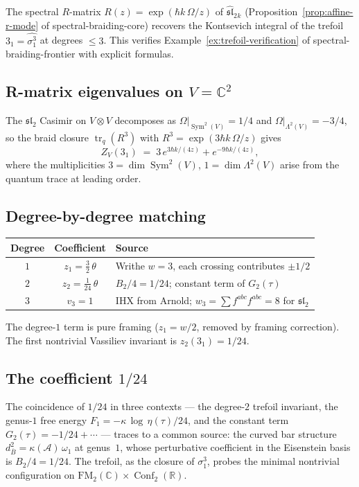 \documentclass[11pt]{article}
\newcommand{\cA}{\mathcal{A}}
\newcommand{\fsl}{\mathfrak{sl}}
\newcommand{\barB}{\overline{B}}
\newcommand{\C}{\mathbb{C}}
\newcommand{\R}{\mathbb{R}}
\newcommand{\FM}{\mathrm{FM}}
\DeclareMathOperator{\Conf}{Conf}
\DeclareMathOperator{\Sym}{Sym}
\begin{document}
The spectral $R$-matrix $R(z) = \exp(\hbar k\,\Omega/z)$ of
$\widehat{\fsl}_2{}_k$
(Proposition~\ref{prop:affine-r-mode} of spectral-braiding-core)
recovers the Kontsevich integral of the trefoil $3_1 =
\widehat{\sigma_1^3}$ at degrees $\le 3$.  This verifies
Example~\ref{ex:trefoil-verification} of spectral-braiding-frontier
with explicit formulas.

\subsection*{R-matrix eigenvalues on $V = \C^2$}

The $\fsl_2$ Casimir on $V \otimes V$ decomposes as
$\Omega|_{\Sym^2(V)} = 1/4$ and
$\Omega|_{\Lambda^2(V)} = -3/4$, so the braid closure
$\operatorname{tr}_q(R^3)$ with $R^3 = \exp(3\hbar k\,\Omega/z)$
gives
\[
  Z_V(3_1)
  \;=\;
  3\,e^{3\hbar k/(4z)} + e^{-9\hbar k/(4z)},
\]
where the multiplicities $3 = \dim\Sym^2(V)$,
$1 = \dim\Lambda^2(V)$ arise from the quantum trace at leading
order.

\subsection*{Degree-by-degree matching}

\begin{center}
\renewcommand{\arraystretch}{1.3}
\begin{tabular}{ccl}
\textbf{Degree} & \textbf{Coefficient} & \textbf{Source} \\
\hline
$1$ & $z_1 = \tfrac{3}{2}\,\theta$ &
  Writhe $w = 3$, each crossing contributes $\pm 1/2$ \\
$2$ & $z_2 = \tfrac{1}{24}\,\theta$ &
  $B_2/4 = 1/24$; constant term of $G_2(\tau)$ \\
$3$ & $v_3 = 1$ &
  IHX from Arnold; $w_3 = \sum f^{abc}f^{abc} = 8$ for $\fsl_2$
\end{tabular}
\end{center}

\noindent
The degree-$1$ term is pure framing ($z_1 = w/2$, removed by
framing correction).  The first nontrivial Vassiliev invariant
is $z_2(3_1) = 1/24$.

\subsection*{The coefficient $1/24$}

The coincidence of $1/24$ in three contexts --- the degree-$2$
trefoil invariant, the genus-$1$ free energy
$F_1 = -\kappa\,\log\,\eta(\tau)/24$, and the constant term
$G_2(\tau) = -1/24 + \cdots$ --- traces to a common source:
the curved bar structure $d_{\barB}^2 = \kappa(\cA)\,\omega_1$
at genus~$1$, whose perturbative coefficient in the Eisenstein
basis is $B_2/4 = 1/24$.  The trefoil, as the closure of
$\sigma_1^3$, probes the minimal nontrivial configuration on
$\FM_2(\C) \times \Conf_2(\R)$.
\end{document}
